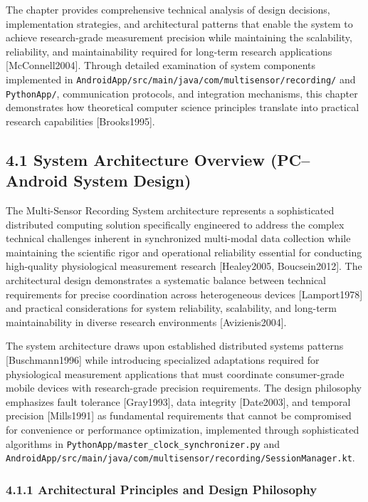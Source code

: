\documentclass[12pt,a4paper]{article}
\begin{document}
The chapter provides comprehensive technical analysis of design decisions, implementation strategies, and architectural
patterns that enable the system to achieve research-grade measurement precision while maintaining the scalability,
reliability, and maintainability required for long-term research applications [McConnell2004]. Through detailed
examination of system components implemented in \texttt{AndroidApp/src/main/java/com/multisensor/recording/} and
\texttt{PythonApp/}, communication protocols, and integration mechanisms, this chapter demonstrates how theoretical
computer science principles translate into practical research capabilities [Brooks1995].

\subsection{4.1 System Architecture Overview (PC–Android System Design)}

The Multi-Sensor Recording System architecture represents a sophisticated distributed computing solution specifically
engineered to address the complex technical challenges inherent in synchronized multi-modal data collection while
maintaining the scientific rigor and operational reliability essential for conducting high-quality physiological
measurement research [Healey2005, Boucsein2012]. The architectural design demonstrates a systematic balance between
technical requirements for precise coordination across heterogeneous devices [Lamport1978] and practical considerations
for system reliability, scalability, and long-term maintainability in diverse research environments [Avizienis2004].

The system architecture draws upon established distributed systems patterns [Buschmann1996] while introducing
specialized adaptations required for physiological measurement applications that must coordinate consumer-grade mobile
devices with research-grade precision requirements. The design philosophy emphasizes fault tolerance [Gray1993], data
integrity [Date2003], and temporal precision [Mills1991] as fundamental requirements that cannot be compromised for
convenience or performance optimization, implemented through sophisticated algorithms in
\texttt{PythonApp/master\_clock\_synchronizer.py} and \texttt{AndroidApp/src/main/java/com/multisensor/recording/SessionManager.kt}.

\subsubsection{4.1.1 Architectural Principles and Design Philosophy}
\end{document}
